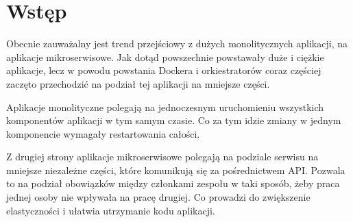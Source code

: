 \documentclass{iiuwb}
\begin{document}
\tableofcontents


\cleardoublepage
\chapter*{Wstęp}                %
\label{cha:Wstep}                       %

Obecnie zauważalny jest trend przejściowy z dużych monolitycznych aplikacji, na aplikacje mikroserwisowe. Jak dotąd powszechnie powstawały duże i ciężkie aplikacje, lecz w powodu powstania Dockera i orkiestratorów coraz częściej zaczęto przechodzić na podział tej aplikacji na mniejsze części.

Aplikacje monolityczne polegają na jednoczesnym uruchomieniu wszystkich komponentów aplikacji w tym samym czasie. Co za tym idzie zmiany w jednym komponencie wymagały restartowania całości.

Z drugiej strony aplikacje mikroserwisowe polegają na podziale serwisu na mniejsze niezależne części, które komunikują się za pośrednictwem API. Pozwala to na podział obowiązków między członkami zespołu w taki sposób, żeby praca jednej osoby nie wpływała na pracę drugiej. Co prowadzi do zwiększenie elastyczności i ułatwia utrzymanie kodu aplikacji.
\end{document}
